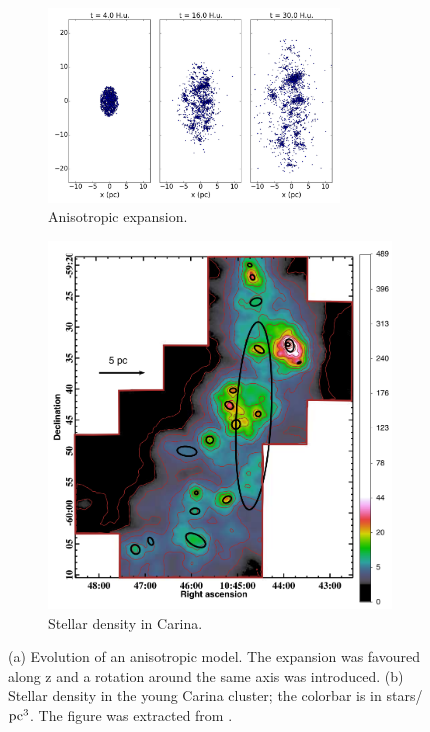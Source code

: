 \begin{figure}
    \centering
    \begin{subfigure}[b]{\textwidth}
        \centering
        \includegraphics[width=0.85\textwidth]{Figures/7_anisotropic.png}
        \caption{Anisotropic \HubLem expansion.}
        \label{Fig:7_anisotropic}
    \end{subfigure}
    
    \begin{subfigure}[b]{0.6\textwidth}
        \centering
        \includegraphics[width=\textwidth]{Figures/7_carina.png}
        \caption{Stellar density in Carina.}
        \label{Fig:7_carina}
    \end{subfigure}
     \caption[Example of anisotropic expansion and comparison to Carina]{(a) Evolution of an anisotropic \HubLem model. The expansion was favoured along z and a rotation around the same axis was introduced. (b) Stellar density in the young Carina cluster; the colorbar is in stars/${\textrm{pc}}^3$. The figure was extracted from \protect\cite{Kuhn2014}.}
     \label{Fig:7_filament}
\end{figure}




